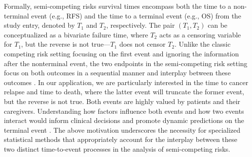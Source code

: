 \documentclass[aoas]{imsart}
\theoremstyle{plain}
\begin{document}
Formally, semi-competing risks survival times encompass both the time to a non-terminal event (e.g., RFS) and the time to a terminal event (e.g., OS) from the study entry, denoted by $T_1$ and $T_2$, respectively. The pair $(T_{1},T_{2})$ can be conceptualized as a bivariate failure time, where $T_{2}$ acts as a censoring variable for $T_{1}$, but the reverse is not true—$T_{1}$ does not censor $T_{2}$. %
Unlike the classic competing risk setting \citep{fine1999competing,young2020} focusing on the first event and ignoring the information after the nonterminal event, the two endpoints in the semi-competing risk setting focus on both outcomes in a sequential manner and interplay between these outcomes \citep{varadhan2014semicompeting}. In our application, we are particularly interested in the time to cancer relapse and time to death, where the latter event will truncate the former event, but the reverse is not true. Both events are highly valued by patients and their caregivers. 
Understanding how factors influence both events and how two events interact would inform clinical decisions and promote dynamic predictions on the terminal event \citep{li2016flexible}. The above motivation underscores the necessity for specialized statistical methods that appropriately account for the interplay between these two distinct time-to-event processes in the analysis of semi-competing risks.


\end{document}
